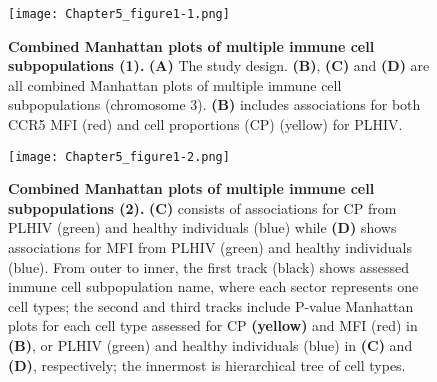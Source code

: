 \documentclass{book}
\begin{document}
\begin{refsection}
\begin{landscape}
\begin{figure}
  \centering
  \texttt{[image: Chapter5\_figure1-1.png]}
  \caption{\label{fig:chp5fig1}
    \textbf{Combined Manhattan plots of multiple immune cell subpopulations (1).}
    \textbf{(A)} The study design.
    \textbf{(B)}, \textbf{(C)} and \textbf{(D)} are all combined Manhattan plots of multiple immune cell subpopulations (chromosome 3).
    \textbf{(B)} includes associations for both CCR5 MFI (red) and cell proportions (CP) (yellow) for PLHIV.
  }
\end{figure}
\begin{figure}
  \centering
  \addtocounter{figure}{-1}
  \texttt{[image: Chapter5\_figure1-2.png]}
  \caption{
    \textbf{Combined Manhattan plots of multiple immune cell subpopulations (2).}
    \textbf{(C)} consists of associations for CP from PLHIV (green) and healthy individuals (blue) while \textbf{(D)} shows associations for MFI from PLHIV (green) and healthy individuals (blue).
    From outer to inner, the first track (black) shows assessed immune cell subpopulation name, where each sector represents one cell types;
    the second and third tracks include P-value Manhattan plots for each cell type assessed for CP \textbf{(yellow)} and MFI (red) in \textbf{(B)}, or PLHIV (green) and healthy individuals (blue) in \textbf{(C)} and \textbf{(D)}, respectively;
    the innermost is hierarchical tree of cell types.
  }
\end{figure}


\end{landscape}
\end{refsection}
\end{document}
